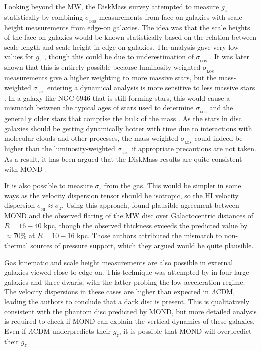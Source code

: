 \documentclass[fleqn,usenatbib,useAMS]{mnras} %
\begin{document}
Looking beyond the MW, the DiskMass survey \citep{Bershady_2010} attempted to measure $g_z$ statistically by combining $\sigma_{_\text{LOS}}$ measurements from face-on galaxies with scale height measurements from edge-on galaxies. The idea was that the scale heights of the face-on galaxies would be known statistically based on the relation between scale length and scale height in edge-on galaxies. The analysis gave very low values for $g_z$ \citep{Angus_2015}, though this could be due to underestimation of $\sigma_{_\text{LOS}}$ \citep{Angus_2016_DiskMass}. It was later shown that this is entirely possible because luminosity-weighted $\sigma_{_\text{LOS}}$ measurements give a higher weighting to more massive stars, but the mass-weighted $\sigma_{_\text{LOS}}$ entering a dynamical analysis is more sensitive to less massive stars \citep{Aniyan_2016, Aniyan_2018}. In a galaxy like NGC 6946 that is still forming stars, this would cause a mismatch between the typical ages of stars used to determine $\sigma_{_\text{LOS}}$ and the generally older stars that comprise the bulk of the mass \citep{Aniyan_2021}. As the stars in disc galaxies should be getting dynamically hotter with time due to interactions with molecular clouds \citep{Aumer_2016} and other processes, the mass-weighted $\sigma_{_\text{LOS}}$ could indeed be higher than the luminosity-weighted $\sigma_{_\text{LOS}}$ if appropriate precautions are not taken. As a result, it has been argued that the DiskMass results are quite consistent with MOND \citep{Milgrom_2018_DiskMass}.

It is also possible to measure $\sigma_z$ from the gas. This would be simpler in some ways as the velocity dispersion tensor should be isotropic, so the HI velocity dispersion $\sigma_{_\text{HI}} \approx \sigma_z$. Using this approach, \citet{Sanchez_2008} found plausible agreement between MOND and the observed flaring of the MW disc over Galactocentric distances of $R = 16-40$ kpc, though the observed thickness exceeds the predicted value by $\approx 70\%$ at $R = 10-16$ kpc. Those authors attributed the mismatch to non-thermal sources of pressure support, which they argued would be quite plausible.

Gas kinematic and scale height measurements are also possible in external galaxies viewed close to edge-on. This technique was attempted by \citet{Das_2020} in four large galaxies and three dwarfs, with the latter probing the low-acceleration regime. The velocity dispersions in these cases are higher than expected in $\Lambda$CDM, leading the authors to conclude that a dark disc is present. This is qualitatively consistent with the phantom disc predicted by MOND, but more detailed analysis is required to check if MOND can explain the vertical dynamics of these galaxies. Even if $\Lambda$CDM underpredicts their $g_z$, it is possible that MOND will overpredict their $g_z$.
\end{document}
